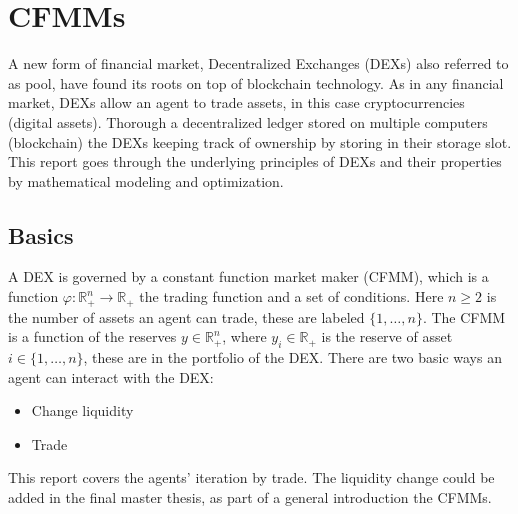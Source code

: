 


\maketitle

\tableofcontents
\section{CFMMs}
A new form of financial market, Decentralized Exchanges (DEXs) also referred
to as pool, have found its roots on top of blockchain technology. As in any
financial market, DEXs allow an agent to trade assets, in this case
cryptocurrencies (digital assets). Thorough a decentralized ledger stored on
multiple computers (blockchain) the DEXs keeping track of ownership by
storing in their storage slot. This report goes through the underlying
principles of DEXs and their properties by mathematical modeling and
optimization.

\subsection{Basics}
A DEX is governed by a constant function market maker (CFMM), which is a
function $\varphi:\mathbb{R}^{n}_{+} \to \mathbb{R}_+$ the trading function
and a set of conditions. Here $n \ge 2$ is the number of assets an agent can
trade, these are labeled $\{1,\ldots, n\}$. The CFMM is a function of the
reserves $y \in \mathbb{R}^{n}_+$, where $y_i \in \mathbb{R}_+$ is the
reserve of asset $i \in \{1,\ldots,n\}$, these are in the portfolio of the
DEX. There are two basic ways an agent can interact with the DEX:
\begin{itemize}
    \item Change liquidity
    \item Trade
\end{itemize}
This report covers the agents' iteration by trade. The liquidity change
could be added in the final master thesis, as part of a general introduction
the CFMMs.

